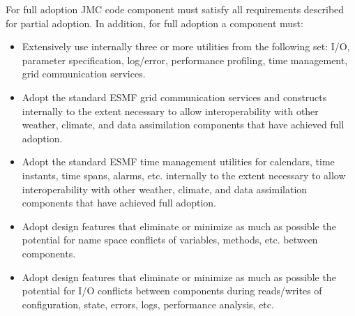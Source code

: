 For full adoption JMC code component must satisfy all requirements 
described for partial adoption.  In addition, for full adoption a
component must:

\begin{itemize}
\item Extensively use internally three or more utilities from the following
set:
   I/O, parameter specification, log/error, performance profiling, time
   management, grid communication services.

\item Adopt the standard ESMF grid communication services and constructs
   internally to the extent necessary to allow interoperability with
   other weather, climate, and data assimilation components that have 
   achieved full adoption.

\item Adopt the standard ESMF time management utilities for calendars,
time instants, time spans, alarms, etc. internally to the extent
necessary to allow interoperability with other weather, climate, and 
data assimilation components that have achieved full adoption.

\item Adopt design features that eliminate or minimize as much as possible
the potential for name space conflicts of variables, methods, etc.
between components.

\item Adopt design features that eliminate or minimize as much as possible
the potential for I/O conflicts between components during reads/writes
of configuration, state, errors, logs, performance analysis, etc.
\end{itemize}


